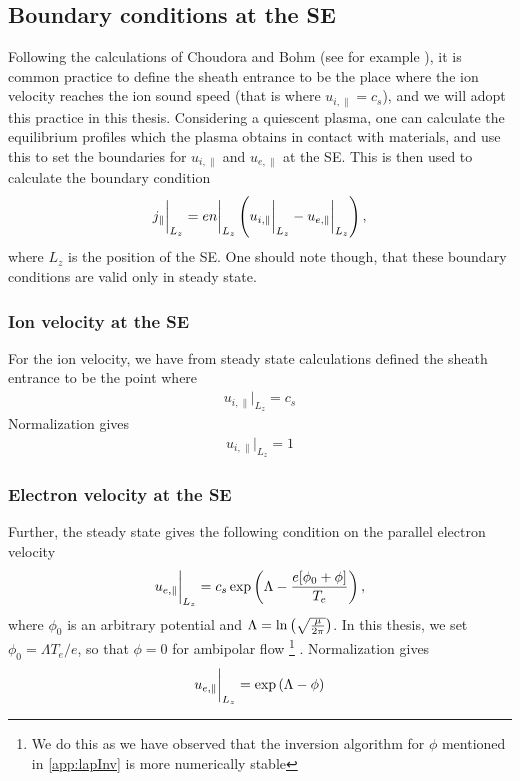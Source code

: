 \subsection{Boundary conditions at the SE}
\label{sec:BCatSE}
%
Following the calculations of Choudora and Bohm (see for example \cite{Stangeby2000book}), it is common practice to define the sheath entrance to be the place where the ion velocity reaches the ion sound speed (that is where $u_{i,\|}=c_s$), and we will adopt this practice in this thesis.
Considering a quiescent plasma, one can calculate the equilibrium profiles which the plasma obtains in contact with materials, and use this to set the boundaries for $u_{i, \|}$ and $u_{e, \|}$ at the SE.
This is then used to calculate the boundary condition
%
\begin{align*}
    j_\|\bigg|_{L_z}=en\bigg|_{L_z}\left(u_{i, \|}\bigg|_{L_z}-u_{e, \|}\bigg|_{L_z}\right),
\end{align*}
%
where $L_z$ is the position of the SE.
One should note though, that these boundary conditions are valid only in steady state.

\subsubsection{Ion velocity at the SE}
For the ion velocity, we have from steady state calculations defined the sheath entrance to be the point where
%
\begin{align*}
    u_{i,\|} \bigg|_{L_z} = c_s
\end{align*}
%
Normalization gives
%
\begin{align*}
    u_{i,\|} \bigg|_{L_z} = 1
\end{align*}
%

\subsubsection{Electron velocity at the SE}
%
Further, the steady state gives the following condition on the parallel electron velocity
%
\begin{align*}
    u_{e,\|} \bigg|_{L_z} = c_s \exp\left(\Lambda - \frac{e[\phi_0 + \phi]}{T_e}\right),
\end{align*}
%
where $\phi_0$ is an arbitrary potential and $\Lambda=\ln\left(\sqrt{\frac{\mu}{2\pi}}\right)$.
In this thesis, we set $\phi_0=\Lambda T_e/e$, so that $\phi=0$ for ambipolar flow%
%
\footnote{We do this as we have observed that the inversion algorithm for $\phi$ mentioned in \cref{app:lapInv} is more numerically stable}%
%
.
Normalization gives
%
\begin{align*}
    u_{e,\|} \bigg|_{L_z} = \exp\left(\Lambda - \phi\right)
\end{align*}
%

